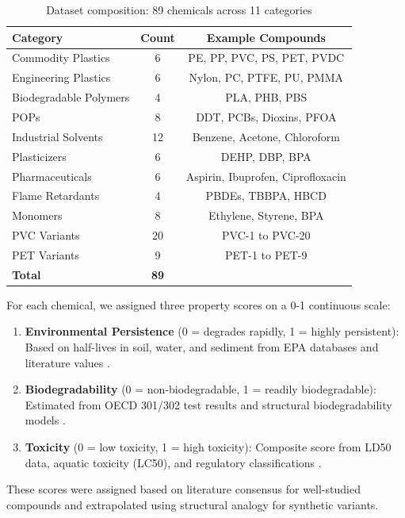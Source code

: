 \documentclass[11pt,letterpaper]{article}
\begin{document}
\begin{table}[H]
\centering
\caption{Dataset composition: 89 chemicals across 11 categories}
\label{tab:dataset_categories}
\begin{tabular}{lcc}
\toprule
\textbf{Category} & \textbf{Count} & \textbf{Example Compounds} \\
\midrule
Commodity Plastics & 6 & PE, PP, PVC, PS, PET, PVDC \\
Engineering Plastics & 6 & Nylon, PC, PTFE, PU, PMMA \\
Biodegradable Polymers & 4 & PLA, PHB, PBS \\
POPs & 8 & DDT, PCBs, Dioxins, PFOA \\
Industrial Solvents & 12 & Benzene, Acetone, Chloroform \\
Plasticizers & 6 & DEHP, DBP, BPA \\
Pharmaceuticals & 6 & Aspirin, Ibuprofen, Ciprofloxacin \\
Flame Retardants & 4 & PBDEs, TBBPA, HBCD \\
Monomers & 8 & Ethylene, Styrene, BPA \\
PVC Variants & 20 & PVC-1 to PVC-20 \\
PET Variants & 9 & PET-1 to PET-9 \\
\midrule
\textbf{Total} & \textbf{89} & \\
\bottomrule
\end{tabular}
\end{table}

For each chemical, we assigned three property scores on a 0-1 continuous scale:

\begin{enumerate}
    \item \textbf{Environmental Persistence} (0 = degrades rapidly, 1 = highly persistent): Based on half-lives in soil, water, and sediment from EPA databases \cite{epa_persistence} and literature values \cite{mackay2001handbook}.
    \item \textbf{Biodegradability} (0 = non-biodegradable, 1 = readily biodegradable): Estimated from OECD 301/302 test results \cite{oecd301} and structural biodegradability models \cite{dimitrov2005base}.
    \item \textbf{Toxicity} (0 = low toxicity, 1 = high toxicity): Composite score from LD50 data, aquatic toxicity (LC50), and regulatory classifications \cite{posthuma2001species}.
\end{enumerate}

These scores were assigned based on literature consensus for well-studied compounds and extrapolated using structural analogy for synthetic variants.
\end{document}
